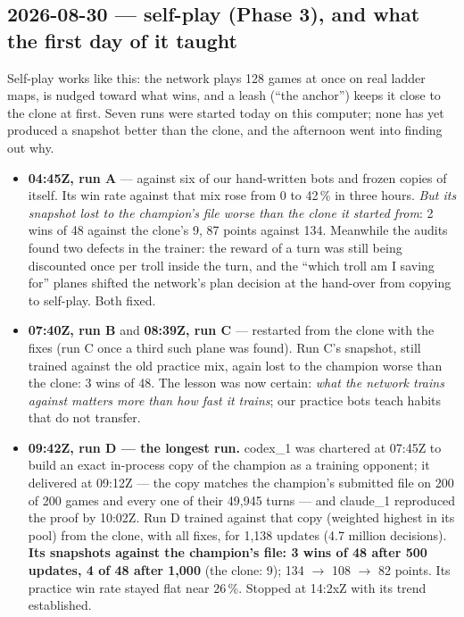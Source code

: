 \documentclass[11pt,a4paper]{article}
\begin{document}
\subsection*{2026-08-30 --- self-play (Phase 3), and what the first day of it taught}
Self-play works like this: the network plays 128 games at once on real ladder maps, is nudged toward what wins, and a leash (``the anchor'') keeps it close to the clone at first. Seven runs were started today on this computer; none has yet produced a snapshot better than the clone, and the afternoon went into finding out why.

\begin{itemize}[nosep,leftmargin=1.4em]
  \item \textbf{04:45Z, run A} --- against six of our hand-written bots and frozen copies of itself. Its win rate against that mix rose from 0 to 42\,\% in three hours. \emph{But its snapshot lost to the champion's file worse than the clone it started from}: 2 wins of 48 against the clone's 9, 87 points against 134. Meanwhile the audits found two defects in the trainer: the reward of a turn was still being discounted once per troll inside the turn, and the ``which troll am I saving for'' planes shifted the network's plan decision at the hand-over from copying to self-play. Both fixed.
  \item \textbf{07:40Z, run B} and \textbf{08:39Z, run C} --- restarted from the clone with the fixes (run C once a third such plane was found). Run C's snapshot, still trained against the old practice mix, again lost to the champion worse than the clone: 3 wins of 48. The lesson was now certain: \emph{what the network trains against matters more than how fast it trains}; our practice bots teach habits that do not transfer.
  \item \textbf{09:42Z, run D --- the longest run.} codex\_1 was chartered at 07:45Z to build an exact in-process copy of the champion as a training opponent; it delivered at 09:12Z --- the copy matches the champion's submitted file on 200 of 200 games and every one of their 49,945 turns --- and claude\_1 reproduced the proof by 10:02Z. Run D trained against that copy (weighted highest in its pool) from the clone, with all fixes, for 1,138 updates (4.7 million decisions). \textbf{Its snapshots against the champion's file: 3 wins of 48 after 500 updates, 4 of 48 after 1,000} (the clone: 9); 134 $\rightarrow$ 108 $\rightarrow$ 82 points. Its practice win rate stayed flat near 26\,\%. Stopped at 14:2xZ with its trend established.

\end{itemize}
\end{document}
